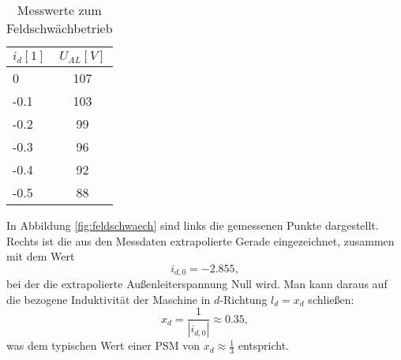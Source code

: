 \begin{table}[!ht]
\centering%
    \begin{tabular}{|l|c|}
    \hline
    $i_d [1]$ & $U_{AL} [V]$ \\ \hline
    0         & 107          \\ \hline
    -0.1      & 103          \\ \hline
    -0.2      & 99           \\ \hline
    -0.3      & 96           \\ \hline
    -0.4      & 92           \\ \hline
    -0.5      & 88           \\ \hline
    \end{tabular}
    \caption{Messwerte zum Feldschwächbetrieb}
    \label{tab:PSM_feldschwaech}
\end{table}
\noindent In Abbildung \ref{fig:feldschwaech} sind links die gemessenen Punkte dargestellt. Rechts ist die aus den Messdaten extrapolierte Gerade eingezeichnet, zusammen mit dem Wert
\begin{equation*}
    i_{d,0} = -2.855,
\end{equation*}
bei der die extrapolierte Außenleiterspannung Null wird. Man kann daraus auf die bezogene Induktivität der Maschine in $d$-Richtung $l_d=x_d$ schließen:
\begin{equation*}
    x_d = \frac{1}{|i_{d,0}|} \approx 0.35,
\end{equation*}
was dem typischen Wert einer PSM von $x_d \approx \frac{1}{3}$ entspricht.
